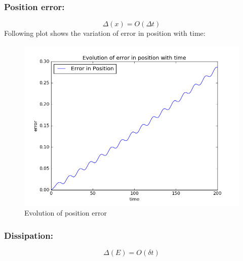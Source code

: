 \documentclass[11pt, a4paper]{article}
\begin{document}
\subsubsection{Position error:}
\begin{equation}
 \Delta (x) = O(\Delta t)
\end{equation}
Following plot shows the variation of error in position with time:
\begin{figure}[H]
 \centering
 \includegraphics[scale = 0.5]{Sem_err_pos_1.png}
 \caption{Evolution of position error}
\end{figure}


\subsubsection{Dissipation:}
\begin{equation}
 \Delta (E) = O (\delta t)
\end{equation}
\end{document}
